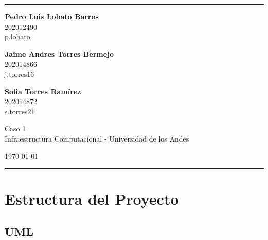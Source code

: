 \documentclass[a4paper]{article}
\begin{document}

    \fancyhead[C]{}
    \hrule \medskip %
    \begin{minipage}{0.295\textwidth}
        \raggedright
        \footnotesize
        \textbf{Pedro Luis Lobato Barros} \hfill\\
        202012490\hfill\\
        p.lobato

        \textbf{Jaime Andres Torres Bermejo} \hfill\\
        202014866\hfill\\
        j.torres16

        \textbf{Sofia Torres Ram\'irez} \hfill\\
        202014872\hfill\\
        s.torres21

    \end{minipage}
    \begin{minipage}{0.4\textwidth}
        \centering
        \large
        Caso 1\\
        \normalsize
        Infraestructura Computacional - Universidad de los Andes\\
    \end{minipage}
    \begin{minipage}{0.295\textwidth}
        \raggedleft
        \today\hfill\\
    \end{minipage}
    \medskip\hrule
    \bigskip



    \section{Estructura del Proyecto}

    \subsection{UML}
\end{document}
